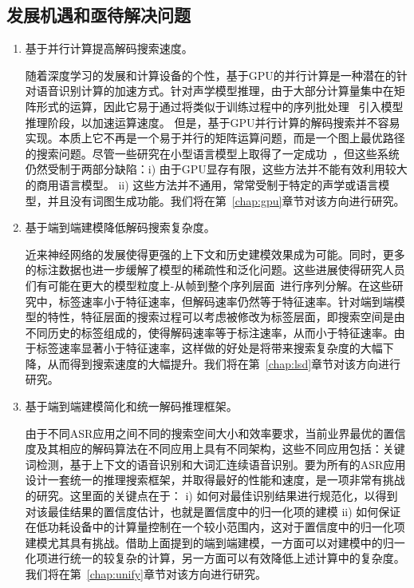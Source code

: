 \subsection{发展机遇和亟待解决问题}
\label{chap:intro2-dec-todo}
\begin{enumerate}
\item 基于并行计算提高解码搜索速度。

随着深度学习的发展和计算设备的个性，基于GPU的并行计算是一种潜在的针对语音识别计算的加速方式。针对声学模型推理，由于大部分计算量集中在矩阵形式的运算，因此它易于通过将类似于训练过程中\cite{vesely2010parallel}的序列批处理~\cite{dixon2009harnessing} 引入模型推理阶段，以加速运算速度。
但是，基于GPU并行计算的解码搜索并不容易实现。本质上它不再是一个易于并行的矩阵运算问题，而是一个图上最优路径的搜索问题。尽管一些研究在小型语言模型上取得了一定成功~\cite{you2009parallel}，但这些系统仍然受制于两部分缺陷：i) 由于GPU显存有限，这些方法并不能有效利用较大的商用语言模型。
ii) 这些方法并不通用，常常受制于特定的声学或语言模型，并且没有词图生成功能。我们将在第~\ref{chap:gpu}章节对该方向进行研究。

\item 基于端到端建模降低解码搜索复杂度。

近来神经网络的发展使得更强的上下文和历史建模效果成为可能\cite{sak2014long,qian2016very}。同时，更多的标注数据也进一步缓解了模型的稀疏性和泛化问题。这些进展使得研究人员们有可能在更大的模型粒度上-从帧到整个序列层面~\cite{amodei2015deep,soltau2016neural,collobert2016wav2letter,sak2015fast,chan2016end}进行序列分解。在这些研究中，标签速率小于特征速率，但解码速率仍然等于特征速率。针对端到端模型的特性，特征层面的搜索过程可以考虑被修改为标签层面，即搜索空间是由不同历史的标签组成的，使得解码速率等于标注速率，从而小于特征速率。由于标签速率显著小于特征速率，这样做的好处是将带来搜索复杂度的大幅下降，从而得到搜索速度的大幅提升。我们将在第~\ref{chap:lsd}章节对该方向进行研究。

\item 基于端到端建模简化和统一解码推理框架。

由于不同ASR应用之间不同的搜索空间大小和效率要求，当前业界最优的置信度及其相应的解码算法在不同应用上具有不同架构，这些不同应用包括：关键词检测，基于上下文的语音识别和大词汇连续语音识别。要为所有的ASR应用设计一套统一的推理搜索框架，并取得最好的性能和速度，是一项非常有挑战的研究。这里面的关键点在于： i) 如何对最佳识别结果进行规范化，以得到对该最佳结果的置信度估计，也就是置信度中的归一化项的建模   ii) 如何保证在低功耗设备中的计算量控制在一个较小范围内，这对于置信度中的归一化项建模尤其具有挑战。借助上面提到的端到端建模，一方面可以对建模中的归一化项进行统一的较复杂的计算，另一方面可以有效降低上述计算中的复杂度。我们将在第~\ref{chap:unify}章节对该方向进行研究。



\end{enumerate}
